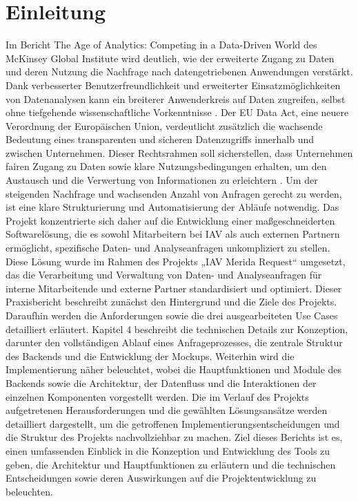 \chapter{Einleitung}
\label{chap:einleitung}
Im Bericht \glqq The Age of Analytics: Competing in a Data-Driven World\grqq{} des McKinsey Global Institute wird deutlich, wie der erweiterte Zugang zu Daten und deren Nutzung die Nachfrage nach datengetriebenen Anwendungen verstärkt. Dank verbesserter Benutzerfreundlichkeit und erweiterter Einsatzmöglichkeiten von Datenanalysen kann ein breiterer Anwenderkreis auf Daten zugreifen, selbst ohne tiefgehende wissenschaftliche Vorkenntnisse \cite{mckinsey2016analytics}.
\newline
Der EU Data Act, eine neuere Verordnung der Europäischen Union, verdeutlicht zusätzlich die wachsende Bedeutung eines transparenten und sicheren Datenzugriffs innerhalb und zwischen Unternehmen. Dieser Rechtsrahmen soll sicherstellen, dass Unternehmen fairen Zugang zu Daten sowie klare Nutzungsbedingungen erhalten, um den Austausch und die Verwertung von Informationen zu erleichtern \cite{EUData_JohnerInstitut}.
\newline
\newline
Um der steigenden Nachfrage und wachsenden Anzahl von Anfragen gerecht zu werden, ist eine klare Strukturierung und Automatisierung der Abläufe notwendig. Das Projekt konzentrierte sich daher auf die Entwicklung einer maßgeschneiderten Softwarelösung, die es sowohl Mitarbeitern bei IAV als auch externen Partnern ermöglicht, spezifische Daten- und Analyseanfragen unkompliziert zu stellen. Diese Lösung wurde im Rahmen des Projekts „IAV Merida Request“ umgesetzt, das die Verarbeitung und Verwaltung von Daten- und Analyseanfragen für interne Mitarbeitende und externe Partner standardisiert und optimiert.
\newline
Dieser Praxisbericht beschreibt zunächst den Hintergrund und die Ziele des Projekts. Daraufhin werden die Anforderungen sowie die drei ausgearbeiteten Use Cases detailliert erläutert. Kapitel 4 beschreibt die technischen Details zur Konzeption, darunter den vollständigen Ablauf eines Anfrageprozesses, die zentrale Struktur des Backends und die Entwicklung der Mockups. Weiterhin wird die Implementierung näher beleuchtet, wobei die Hauptfunktionen und Module des Backends sowie die Architektur, der Datenfluss und die Interaktionen der einzelnen Komponenten vorgestellt werden. Die im Verlauf des Projekts aufgetretenen Herausforderungen und die gewählten Lösungsansätze werden detailliert dargestellt, um die getroffenen Implementierungsentscheidungen und die Struktur des Projekts nachvollziehbar zu machen.
\newline
\newline
Ziel dieses Berichts ist es, einen umfassenden Einblick in die Konzeption und Entwicklung des Tools zu geben, die Architektur und Hauptfunktionen zu erläutern und die technischen Entscheidungen sowie deren Auswirkungen auf die Projektentwicklung zu beleuchten.






